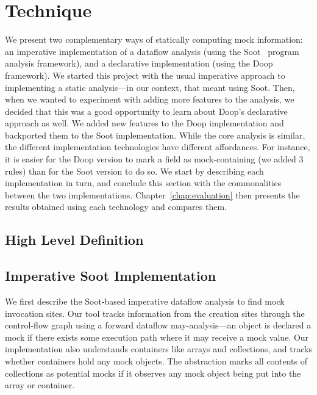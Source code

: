 \chapter{Technique}
\label{chap:technique}	

We present two complementary ways of statically computing mock information: an imperative implementation of a dataflow analysis (using the Soot~\cite{Vallee-Rai:1999:SJB:781995.782008} program analysis framework), and a declarative implementation (using the Doop~\cite{bravenboer09:_stric_declar_specif_sophis_point_analy} framework). We started this project with the usual imperative approach to implementing a static analysis---in our context, that meant using Soot. Then, when we wanted to experiment with adding more features to the analysis, we decided that this was a good opportunity to learn about Doop's declarative approach as well. We added new features to the Doop implementation and backported them to the Soot implementation. While the core analysis is similar, the different implementation technologies have different affordances. For instance, it is easier for the Doop version to mark a field as mock-containing (we added 3 rules) than for the Soot version to do so. We start by describing each implementation in turn, and conclude this section with the commonalities between the two implementations. Chapter~\ref{chap:evaluation} then presents the results obtained using each technology and compares them. 


\section{High Level Definition}
\label{sec:high-level}

\section{Imperative Soot Implementation}
\label{sec:soot}
We first describe the Soot-based imperative dataflow analysis to find mock invocation sites. Our tool tracks information from the creation sites through the control-flow graph using a forward dataflow may-analysis---an object is declared a mock if there exists some execution path where it may receive a mock value. Our implementation also understands containers like arrays and collections, and tracks whether containers hold any mock objects. The abstraction marks all contents of collections as potential mocks if it observes any mock object being put into the array or container.


